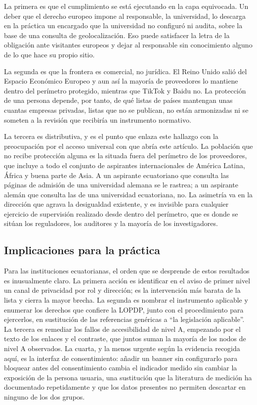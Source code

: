 \documentclass[pdflatex,sn-basic,Numbered]{sn-jnl}
\theoremstyle{thmstyleone}
\theoremstyle{thmstyletwo}
\theoremstyle{thmstylethree}
\begin{document}
La primera es que el cumplimiento se est\'a ejecutando en la capa equivocada. Un deber que el derecho europeo impone al responsable, la universidad, lo descarga en la pr\'actica un encargado que la universidad no configur\'o ni audita, sobre la base de una consulta de geolocalizaci\'on. Eso puede satisfacer la letra de la obligaci\'on ante visitantes europeos y dejar al responsable sin conocimiento alguno de lo que hace su propio sitio.

La segunda es que la frontera es comercial, no jur\'idica. El Reino Unido sali\'o del Espacio Econ\'omico Europeo y aun as\'i la mayor\'ia de proveedores lo mantiene dentro del per\'imetro protegido, mientras que TikTok y Baidu no. La protecci\'on de una persona depende, por tanto, de qu\'e listas de pa\'ises mantengan unas cuantas empresas privadas, listas que no se publican, no est\'an armonizadas ni se someten a la revisi\'on que recibir\'ia un instrumento normativo.

La tercera es distributiva, y es el punto que enlaza este hallazgo con la preocupaci\'on por el acceso universal con que abr\'ia este art\'iculo. La poblaci\'on que no recibe protecci\'on alguna es la situada fuera del per\'imetro de los proveedores, que incluye a todo el conjunto de aspirantes internacionales de Am\'erica Latina, \'Africa y buena parte de Asia. A un aspirante ecuatoriano que consulta las p\'aginas de admisi\'on de una universidad alemana se le rastrea; a un aspirante alem\'an que consulta las de una universidad ecuatoriana, no. La asimetr\'ia va en la direcci\'on que agrava la desigualdad existente, y es invisible para cualquier ejercicio de supervisi\'on realizado desde dentro del per\'imetro, que es donde se sit\'uan los reguladores, los auditores y la mayor\'ia de los investigadores.

\subsection{Implicaciones para la pr\'actica}\label{sec:discussion-practice}

Para las instituciones ecuatorianas, el orden que se desprende de estos resultados es inusualmente claro. La primera acci\'on es identificar en el aviso de primer nivel un canal de privacidad por rol y direcci\'on; es la intervenci\'on m\'as barata de la lista y cierra la mayor brecha. La segunda es nombrar el instrumento aplicable y enumerar los derechos que confiere la LOPDP, junto con el procedimiento para ejercerlos, en sustituci\'on de las referencias gen\'ericas a ``la legislaci\'on aplicable''. La tercera es remediar los fallos de accesibilidad de nivel A, empezando por el texto de los enlaces y el contraste, que juntos suman la mayor\'ia de los nodos de nivel A observados. La cuarta, y la menos urgente seg\'un la evidencia recogida aqu\'i, es la interfaz de consentimiento: a\~nadir un banner sin configurarlo para bloquear antes del consentimiento cambia el indicador medido sin cambiar la exposici\'on de la persona usuaria, una sustituci\'on que la literatura de medici\'on ha documentado repetidamente \citep{sanchezrola2019can,bollinger2022automating} y que los datos presentes no permiten descartar en ninguno de los dos grupos.
\end{document}
